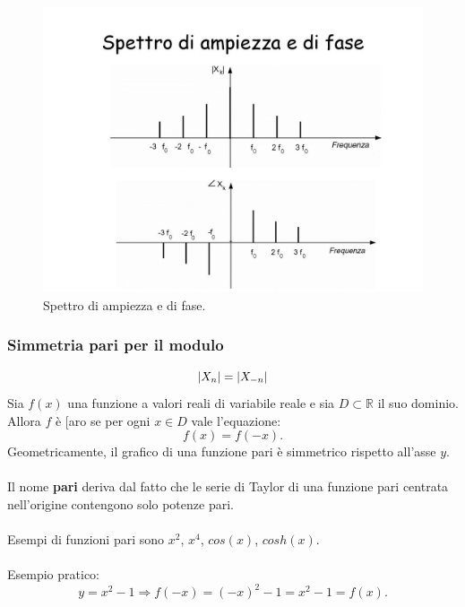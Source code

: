 \documentclass[12pt,oneside,openany]{memoir}
\numberwithin{equation}{subsection}
\DeclarePairedDelimiter{\abs}{\lvert}{\rvert}
\begin{document}
\begin{figure}
\centering
\captionsetup{justification=centering}
\includegraphics[width=1.0\textwidth]{images/spettro_di_ampiezza_e_di_fase.jpg}
\caption{Spettro di ampiezza e di fase.}
\end{figure}

\subsubsection{Simmetria pari per il modulo}
\begin{equation}
	\abs{X_n} = \abs{X_{-n}}
\end{equation}
Sia $f(x)$ una funzione a valori reali di variabile reale e sia $D \subset \mathbb{R}$ il suo dominio. Allora $f$ \`e [aro se per ogni $x \in D$ vale l'equazione:
\[
	f(x) = f(-x).
\]
Geometricamente, il grafico di una funzione pari \`e simmetrico rispetto all'asse $y$.\\
\\
Il nome \textbf{pari} deriva dal fatto che le serie di Taylor di una funzione pari centrata nell'origine contengono solo potenze pari.\\
\\
Esempi di funzioni pari sono $x^2$, $x^4$, $cos(x)$, $cosh(x)$.\\
\\
Esempio pratico:
\[
	y = x^2 - 1 \Longrightarrow f(-x) = (-x)^2 - 1 = x^2 - 1 = f(x).
\]
\end{document}
